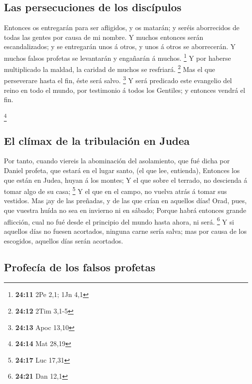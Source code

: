 \hypertarget{las-persecuciones-de-los-discuxedpulos}{%
\subsection{Las persecuciones de los
discípulos}\label{las-persecuciones-de-los-discuxedpulos}}

 Entonces os entregarán para ser afligidos, y os matarán;
y seréis aborrecidos de todas las gentes por causa de mi nombre.
 Y muchos entonces serán escandalizados; y se entregarán
unos á otros, y unos á otros se aborrecerán.  Y muchos
falsos profetas se levantarán y engañarán á muchos. \footnote{\textbf{24:11}
  2Pe 2,1; 1Jn 4,1}  Y por haberse multiplicado la
maldad, la caridad de muchos se resfriará. \footnote{\textbf{24:12} 2Tim
  3,1-5}  Mas el que perseverare hasta el fin, éste será
salvo. \footnote{\textbf{24:13} Apoc 13,10}  Y será
predicado este evangelio del reino en todo el mundo, por testimonio á
todos los Gentiles; y entonces vendrá el fin.

\footnote{\textbf{24:14} Mat 28,19}

\hypertarget{el-cluxedmax-de-la-tribulaciuxf3n-en-judea}{%
\subsection{El clímax de la tribulación en
Judea}\label{el-cluxedmax-de-la-tribulaciuxf3n-en-judea}}

 Por tanto, cuando viereis la abominación del
asolamiento, que fué dicha por Daniel profeta, que estará en el lugar
santo, (el que lee, entienda),  Entonces los que están en
Judea, huyan á los montes;  Y el que sobre el terrado, no
descienda á tomar algo de su casa; \footnote{\textbf{24:17} Luc 17,31}
 Y el que en el campo, no vuelva atrás á tomar sus
vestidos.  Mas ¡ay de las preñadas, y de las que crían en
aquellos días!  Orad, pues, que vuestra huída no sea en
invierno ni en sábado;  Porque habrá entonces grande
aflicción, cual no fué desde el principio del mundo hasta ahora, ni
será. \footnote{\textbf{24:21} Dan 12,1}  Y si aquellos
días no fuesen acortados, ninguna carne sería salva; mas por causa de
los escogidos, aquellos días serán acortados.

\hypertarget{profecuxeda-de-los-falsos-profetas}{%
\subsection{Profecía de los falsos
profetas}\label{profecuxeda-de-los-falsos-profetas}}

